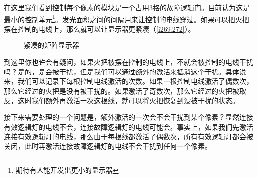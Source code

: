 在这里我们看到控制每个像素的模块是一个占用3格的故障逻辑门。目前认为这是最小的控制单元\footnote{期待有人能开发出更小的显示器}。发光面积之间的间隔用来让控制的电线穿过。如果可以把火把摆在控制的电线上，那么就可以让显示器更紧凑（\autoref{i269:272}）。
\begin{figure}[!ht]
\begin{center}
\qquad
{}
\end{center}
\caption{紧凑的矩阵显示器}
\label{i269:272}
\end{figure}

到这里你也许会有疑问，如果火把被摆在控制的电线上，不就会被控制的电线干扰吗？是的，是会被干扰，但是我们可以通过额外的激活来抵消这个干扰。具体说来，我们可以记录下每根控制电线激活的次数。如果一根控制电线激活了偶数次，那么它经过的火把是没有被干扰的。如果激活了奇数次，那么它经过的火把被取反，这时我们额外再激活一次这根线，就可以将火把恢复到没被干扰的状态。

接下来需要处理的一个问题是，额外激活的一次会不会干扰到某个像素？显然连接有效逻辑灯的电线不会，连接故障逻辑灯的电线可能会。事实上，如果我们先激活连接有效逻辑灯的电线，那么由于每根线都激活了偶数次，所有有效逻辑灯都会被关闭，此时再激活连接故障逻辑灯的电线不会干扰到任何一个像素。

